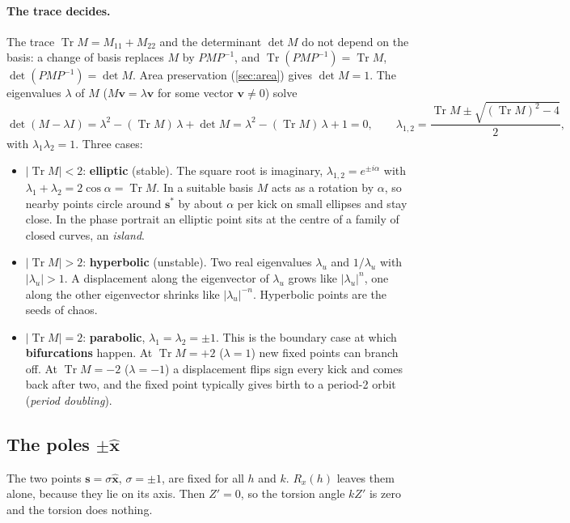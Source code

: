 \documentclass[11pt,a4paper]{article}
\newcommand{\vs}{\bm{s}}
\newcommand{\Tr}{\operatorname{Tr}}
\begin{document}
\paragraph{The trace decides.} The trace $\Tr M = M_{11} + M_{22}$ and the determinant $\det M$ do not depend on the
basis: a change of basis replaces $M$ by $PMP^{-1}$, and $\Tr(PMP^{-1}) = \Tr M$, $\det(PMP^{-1}) = \det M$. Area
preservation (\cref{sec:area}) gives $\det M = 1$. The eigenvalues $\lambda$ of $M$ ($M\bm v = \lambda\bm v$ for some
vector $\bm v\ne0$) solve
\begin{equation*}
  \det(M - \lambda I) = \lambda^2 - (\Tr M)\,\lambda + \det M = \lambda^2 - (\Tr M)\,\lambda + 1 = 0,
  \qquad
  \lambda_{1,2} = \frac{\Tr M \pm \sqrt{(\Tr M)^2 - 4}}{2},
\end{equation*}
with $\lambda_1\lambda_2 = 1$. Three cases:
\begin{itemize}
  \item $|\Tr M| < 2$: \textbf{elliptic} (stable). The square root is imaginary, $\lambda_{1,2} = e^{\pm i\alpha}$ with
  $\lambda_1 + \lambda_2 = 2\cos\alpha = \Tr M$. In a suitable basis $M$ acts as a rotation by $\alpha$, so nearby
  points circle around $\vs^*$ by about $\alpha$ per kick on small ellipses and stay close. In the phase portrait an
  elliptic point sits at the centre of a family of closed curves, an \emph{island}.
  \item $|\Tr M| > 2$: \textbf{hyperbolic} (unstable). Two real eigenvalues $\lambda_u$ and $1/\lambda_u$ with
  $|\lambda_u| > 1$. A displacement along the eigenvector of $\lambda_u$ grows like $|\lambda_u|^n$, one along the other
  eigenvector shrinks like $|\lambda_u|^{-n}$. Hyperbolic points are the seeds of chaos.
  \item $|\Tr M| = 2$: \textbf{parabolic}, $\lambda_1 = \lambda_2 = \pm1$. This is the boundary case at which
  \textbf{bifurcations} happen. At $\Tr M = +2$ ($\lambda = 1$) new fixed points can branch off. At $\Tr M = -2$
  ($\lambda = -1$) a displacement flips sign every kick and comes back after two, and the fixed point typically gives
  birth to a period-2 orbit (\emph{period doubling}).
\end{itemize}

\subsection{The poles \texorpdfstring{$\pm\hat{\bm x}$}{+-x}}\label{sec:poles}

The two points $\vs = \sigma\hat{\bm x}$, $\sigma = \pm1$, are fixed for all $h$ and $k$. $R_x(h)$ leaves them alone,
because they lie on its axis. Then $Z' = 0$, so the torsion angle $kZ'$ is zero and the torsion does nothing.
\end{document}
